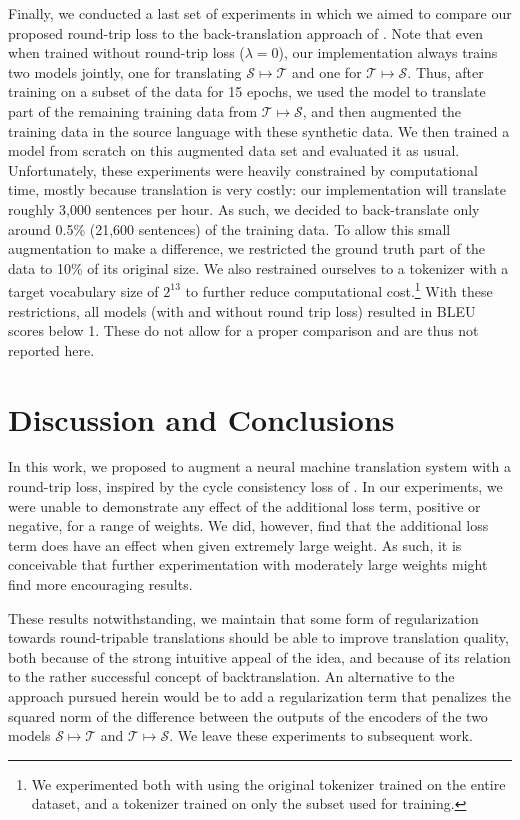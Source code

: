 \documentclass[11pt,a4paper]{article}
\begin{document}
Finally, we conducted a last set of experiments in which we aimed to compare our proposed round-trip loss to the back-translation approach of \citet{backtrans}. Note that even when trained without round-trip loss ($\lambda=0$), our implementation always trains two models jointly, one for translating $\mathcal{S}\mapsto\mathcal{T}$ and one for $\mathcal{T}\mapsto\mathcal{S}$. Thus, after training on a subset of the data for 15 epochs, we used the model to translate part of the remaining training data from $\mathcal{T}\mapsto\mathcal{S}$, and then augmented the training data in the source language with these synthetic data. We then trained a model from scratch on this augmented data set and evaluated it as usual. Unfortunately, these experiments were heavily constrained by computational time, mostly because translation is very costly: our implementation will translate roughly 3,000 sentences per hour. As such, we decided to back-translate only around 0.5\% (21,600 sentences) of the training data. To allow this small augmentation to make a difference, we restricted the ground truth part of the data to 10\% of its original size. We also restrained ourselves to a tokenizer with a target vocabulary size of  $2^{13}$ to further reduce computational cost.\footnote{We experimented both with using the original tokenizer trained on the entire dataset, and a tokenizer trained on only the subset used for training.} With these restrictions, all models (with and without round trip loss)  resulted in BLEU scores below 1. These do not allow for a proper comparison and are thus not reported here.



\section{Discussion and Conclusions}\label{sec:discussion}
In this work, we proposed to augment a neural machine translation system with a round-trip loss, inspired by the cycle consistency loss of \citet{CycleGAN2017}. In our experiments, we were unable to demonstrate any effect of the additional loss term, positive or negative, for a range of weights. We did, however, find that the additional loss term does have an effect when given extremely large weight. As such, it is conceivable that further experimentation with moderately large weights might find more encouraging results. 

These results notwithstanding, we maintain that some form of regularization towards round-tripable translations should be able to improve translation quality, both because of the strong intuitive appeal of the idea, and because of its relation to the rather successful concept of backtranslation. An alternative to the approach pursued herein would be to add a regularization term that penalizes the squared norm of the difference between the outputs of the encoders of the two models $\mathcal{S}\mapsto\mathcal{T}$ and $\mathcal{T}\mapsto\mathcal{S}$. We leave these experiments to subsequent work.
\newpage

\end{document}
